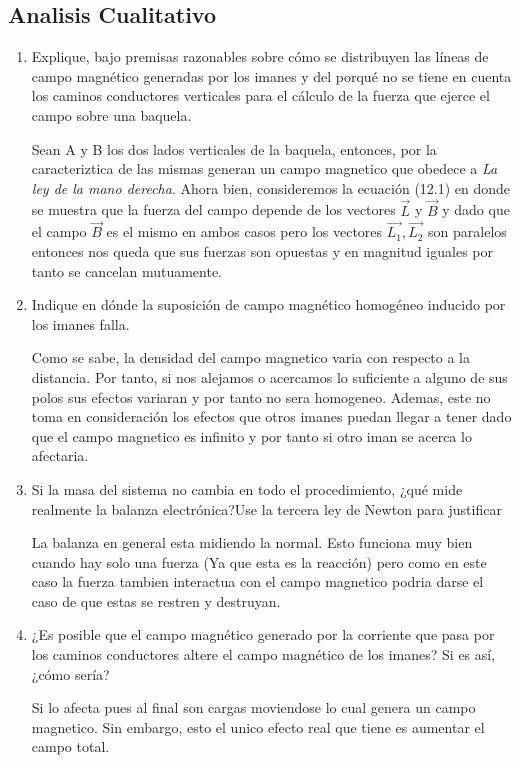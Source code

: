 \documentclass[12pt]{exam}
\begin{document}
\begin{multicols}{2}
\section{Analisis Cualitativo}
\begin{enumerate}
\item Explique, bajo premisas razonables sobre cómo se distribuyen las líneas de campo magnético generadas por
    los imanes y del porqué no se tiene en cuenta los caminos conductores verticales para el cálculo de la fuerza
    que ejerce el campo sobre una baquela.

    Sean A y B los dos lados verticales de la baquela, entonces, por la caracteriztica de las mismas generan un campo magnetico que obedece a \textit{La ley de la mano derecha}. Ahora bien, consideremos la ecuación (12.1) en donde se muestra que la fuerza del campo depende de los vectores $\vec{L}$ y $\vec{B}$ y dado que el campo $\vec{B}$ es el mismo en ambos casos pero los vectores $\vec{L_1},\vec{L_2}$ son paralelos entonces nos queda que sus fuerzas son opuestas y en magnitud iguales por tanto se cancelan mutuamente.

\item Indique en dónde la suposición de campo magnético
  homogéneo inducido por los imanes falla.
    
Como se sabe, la densidad del campo magnetico varia con respecto a la distancia. Por tanto, si nos alejamos o acercamos lo suficiente a alguno de sus polos sus efectos variaran y por tanto no sera homogeneo. Ademas, este no toma en consideración los efectos que otros imanes puedan llegar a tener dado que el campo magnetico es infinito y por tanto si otro iman se acerca lo afectaria.
\item Si la masa del sistema no cambia en todo el procedimiento, ¿qué mide realmente la balanza electrónica?Use la tercera ley de Newton para justificar

  La balanza en general esta midiendo la normal. Esto funciona muy bien cuando hay solo una fuerza (Ya que esta es la reacción) pero como en este caso la fuerza tambien interactua con el campo magnetico podria darse el caso de que estas se restren y destruyan.

\item ¿Es posible que el campo magnético generado por la
  corriente que pasa por los caminos conductores altere el campo magnético de los imanes? Si es así, ¿cómo sería?
    
    Si lo afecta pues al final son cargas moviendose lo cual genera un campo magnetico. Sin embargo, esto el unico efecto real que tiene es aumentar el campo total.


\end{enumerate}
\end{multicols}
\end{document}
